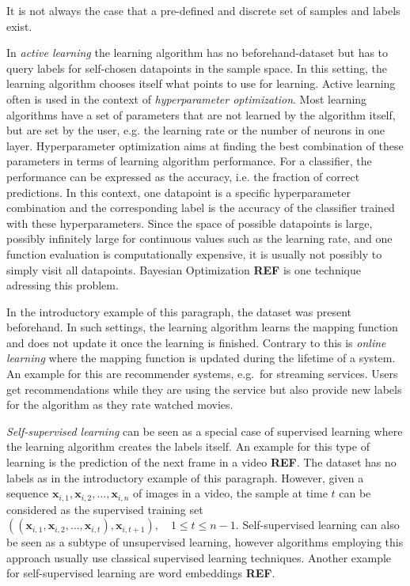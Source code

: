 It is not always the case that a pre-defined and discrete set of samples and labels exist.

In \textit{active learning} the learning algorithm has no beforehand-dataset but has to query labels for self-chosen datapoints in the sample space.
In this setting, the learning algorithm chooses itself what points to use for learning.
Active learning often is used in the context of \textit{hyperparameter optimization}.
Most learning algorithms have a set of parameters that are not learned by the algorithm itself, but are set by the user, e.g. the learning rate or the number of neurons in one layer.
Hyperparameter optimization aims at finding the best combination of these parameters in terms of learning algorithm performance.
For a classifier, the performance can be expressed as the accuracy, i.e. the fraction of correct predictions.
In this context, one datapoint is a specific hyperparameter combination and the corresponding label is the accuracy of the classifier trained with these hyperparameters.
Since the space of possible datapoints is large, possibly infinitely large for continuous values such as the learning rate, and one function evaluation is computationally expensive, it is usually not possibly to simply visit all datapoints.
Bayesian Optimization \textbf{REF} is one technique adressing this problem.

In the introductory example of this paragraph, the dataset was present beforehand.
In such settings, the learning algorithm learns the mapping function and does not update it once the learning is finished.
Contrary to this is \textit{online learning} where the mapping function is updated during the lifetime of a system.
An example for this are recommender systems, e.g.~for streaming services.
Users get recommendations while they are using the service but also provide new labels for the algorithm as they rate watched movies.

\textit{Self-supervised learning} can be seen as a special case of supervised learning where the learning algorithm creates the labels itself.
An example for this type of learning is the prediction of the next frame in a video \textbf{REF}.
The dataset has no labels as in the introductory example of this paragraph.
However, given a sequence $\bm{x}_{i,1},\bm{x}_{i,2},\dots,\bm{x}_{i,n}$ of images in a video, the sample at time $t$ can be considered as the supervised training set $((\bm{x}_{i,1},\bm{x}_{i,2},\dots,\bm{x}_{i,t}),\bm{x}_{i,t+1}), \quad 1\leq t\leq n-1$.
Self-supervised learning can also be seen as a subtype of unsupervised learning, however algorithms employing this approach usually use classical supervised learning techniques.
Another example for self-supervised learning are word embeddings \textbf{REF}.

